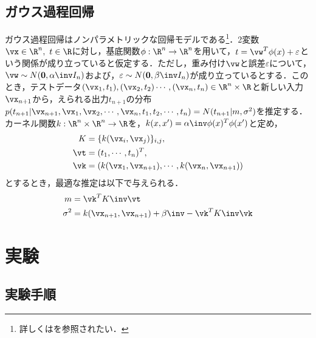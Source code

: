 \documentclass[JEL]{AEA}
\begin{document}
\subsection{ガウス過程回帰}
ガウス過程回帰はノンパラメトリックな回帰モデルである\footnote{詳しくは\cite{bishop}を参照されたい．}．2変数$\vx\in\R^n,\ t\in\R$に対し，基底関数$\phi:\R^n\to\R^n$を用いて，$t=\vw^T\phi(x)+\varepsilon$という関係が成り立っていると仮定する．ただし，重み付け$\vw$と誤差$\varepsilon$について，$\vw\sim N({\bm 0},\alpha\inv I_n)$および，$\varepsilon \sim N({\bm 0,\beta\inv}I_n)$が成り立っているとする．このとき，テストデータ$(\vx_1,t_1),(\vx_2,t_2)\cdots,(\vx_n,t_n)\in\R^n\times \R$と新しい入力$\vx_{n+1}$から，えられる出力$t_{n+1}$の分布$p(t_{n+1}|\vx_{n+1},\vx_1,\vx_2,\cdots,\vx_n,t_1,t_2,\cdots,t_n)=N(t_{n+1}|m,\sigma^2)$を推定する．
カーネル関数$k:\R^n\times\R^n\to\R$を，$k(x,x')=\alpha\inv\phi(x)^T\phi(x')$と定め，
\begin{align*}
 K&=\{k(\vx_i,\vx_j)\}_{i,j},\\
 \vt&=(t_1,\cdots,t_n)^T,\\
 \vk&=(k(\vx_1,\vx_{n+1}),\cdots,k(\vx_n,\vx_{n+1}))
\end{align*}
とするとき，最適な推定は以下で与えられる．
\begin{align*}
 m&=\vk^T K\inv \vt\\
 \sigma^2&=k(\vx_{n+1},\vx_{n+1})+\beta\inv-\vk^TK\inv \vk
\end{align*}

\section{実験}
\subsection{実験手順}
\end{document}
